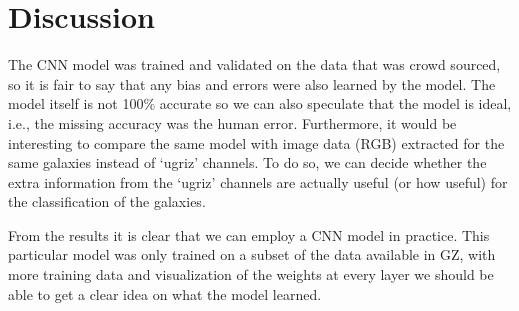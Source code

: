 \section{Discussion}
\label{sec:dis}
The CNN model was trained and validated on the data that was crowd sourced, so it is fair to say that any bias and errors were also learned by the model. The model itself is not 100\% accurate so we can also speculate that the model is ideal, i.e., the missing accuracy was the human error. Furthermore, it would be interesting to compare the same model with image data (RGB) extracted for the same galaxies instead of `ugriz' channels. To do so, we can decide whether the extra information from the `ugriz' channels are actually useful (or how useful) for the classification of the galaxies.

From the results it is clear that we can employ a CNN model in practice. This particular model was only trained on a subset of the data available in GZ, with more training data and visualization of the weights at every layer we should be able to get a clear idea on what the model learned.
